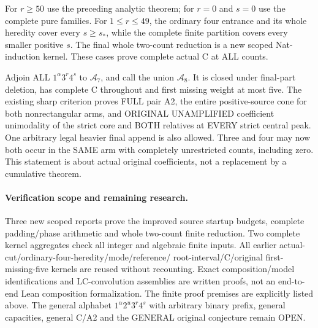 For $r\ge50$ use the preceding analytic theorem; for $r=0$ and $s=0$
use the complete pure families. For $1\le r\le49$, the ordinary
four entrance and its whole heredity cover every $s\ge s_*$, while
the complete finite partition covers every smaller positive $s$.
The final whole two-count reduction is a new scoped Nat-induction
kernel. These cases prove complete actual C at ALL counts.

\begin{corollary}
Adjoin ALL $1^\alpha3^r4^s$ to $\mathcal A_7$, and call the union
$\mathcal A_8$. It is closed under final-part deletion, has complete C
throughout and first missing weight at most five. The existing sharp
criterion proves FULL pair A2, the entire positive-source cone for
both nonrectangular arms, and ORIGINAL UNAMPLIFIED coefficient
unimodality of the strict core and BOTH relatives at EVERY strict
central peak. One arbitrary legal heavier final append is also allowed.
Three and four may now both occur in the SAME arm with completely
unrestricted counts, including zero. This statement is about actual
original coefficients, not a replacement by a cumulative theorem.
\end{corollary}

\paragraph{Verification scope and remaining research.}
Three new scoped reports prove the improved source startup budgets,
complete padding/phase arithmetic and whole two-count finite reduction.
Two complete kernel aggregates check all integer and algebraic finite
inputs. All earlier actual-cut/ordinary-four-heredity/mode/reference/
root-interval/C/original first-missing-five kernels are reused without
recounting. Exact composition/model identifications and LC-convolution
assemblies are written proofs, not an end-to-end Lean composition
formalization. The finite proof premises are explicitly listed above.
The general alphabet $1^\alpha2^u3^r4^s$ with arbitrary binary prefix,
general capacities, general C/A2 and the GENERAL original conjecture
remain OPEN.
